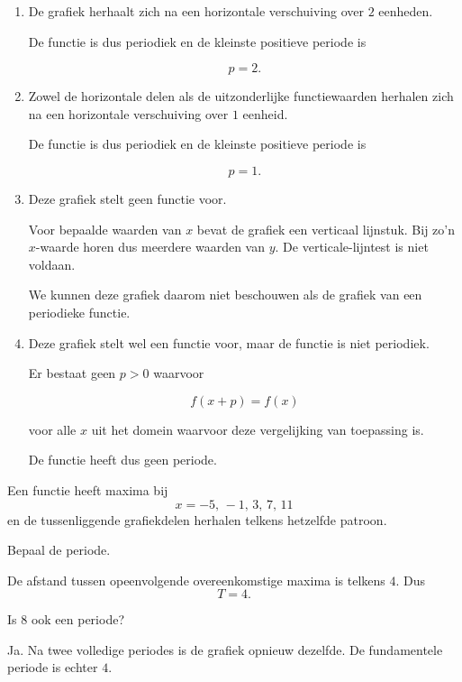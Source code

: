 \documentclass{ximera}
\begin{document}
\begin{oefening}{\oefB\ESS}
\begin{oplossing}
\begin{enumerate}
    \item[(a)]
    De grafiek herhaalt zich na een horizontale verschuiving
    over \(2\) eenheden.

    De functie is dus periodiek en de kleinste positieve periode is

    \[
        \boxed{p=2}.
    \]

    \item[(b)]
    Zowel de horizontale delen als de uitzonderlijke functiewaarden
    herhalen zich na een horizontale verschuiving over \(1\) eenheid.

    De functie is dus periodiek en de kleinste positieve periode is

    \[
        \boxed{p=1}.
    \]

    \item[(c)]
    Deze grafiek stelt geen functie voor.

    Voor bepaalde waarden van \(x\) bevat de grafiek een verticaal
    lijnstuk. Bij zo'n \(x\)-waarde horen dus meerdere waarden van \(y\).
    De verticale-lijntest is niet voldaan.

    We kunnen deze grafiek daarom niet beschouwen als de grafiek van
    een periodieke functie.

    \item[(d)]
    Deze grafiek stelt wel een functie voor, maar de functie is niet
    periodiek.

    Er bestaat geen \(p>0\) waarvoor

    \[
        f(x+p)=f(x)
    \]

    voor alle \(x\) uit het domein waarvoor deze vergelijking van
    toepassing is.

    De functie heeft dus geen periode.
\end{enumerate}

\end{oplossing}

\end{oefening}


\begin{oefening}{\oefB\ESS}

Een functie heeft maxima bij
\[
x=-5,\,-1,\,3,\,7,\,11
\]
en de tussenliggende grafiekdelen herhalen telkens hetzelfde patroon.

\begin{question}
Bepaal de periode.
\begin{oplossing}
De afstand tussen opeenvolgende overeenkomstige maxima is telkens \(4\).
Dus
\[
T=4.
\]
\end{oplossing}
\end{question}

\begin{question}
Is \(8\) ook een periode?
\begin{oplossing}
Ja. Na twee volledige periodes is de grafiek opnieuw dezelfde.
De fundamentele periode is echter \(4\).
\end{oplossing}
\end{question}
\end{oefening}
\end{document}
